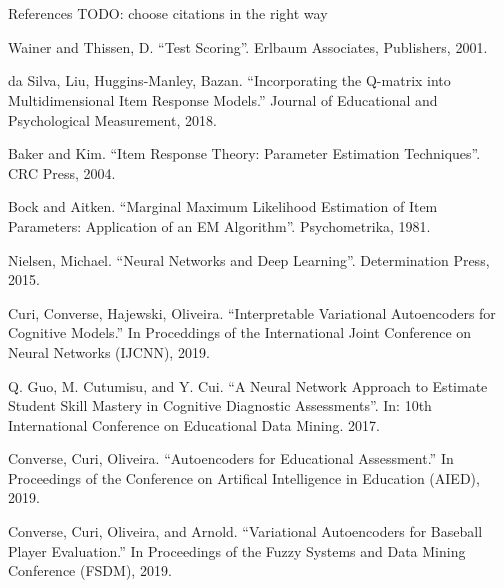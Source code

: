 \documentclass{beamer}
\theoremstyle{definition}
\begin{document}
\section{}
\begin{frame}{References}
    TODO: choose citations in the right way %
\begin{thebibliography}{2}
\tiny

 Wainer and Thissen, D. ``Test Scoring''. Erlbaum Associates, Publishers, 2001.

 da Silva, Liu, Huggins-Manley, Bazan. ``Incorporating the Q-matrix into Multidimensional Item Response Models.'' Journal of Educational and Psychological Measurement, 2018.

 Baker and Kim. ``Item Response Theory: Parameter Estimation Techniques''. CRC Press, 2004.

 Bock and Aitken. ``Marginal Maximum Likelihood Estimation of Item Parameters: Application of an EM Algorithm''. Psychometrika, 1981.

 Nielsen, Michael. ``Neural Networks and Deep Learning''. Determination Press, 2015.

 Curi, Converse, Hajewski, Oliveira. ``Interpretable Variational Autoencoders for Cognitive Models.'' In Proceddings of the International Joint Conference on Neural Networks (IJCNN), 2019.

 Q. Guo, M. Cutumisu, and Y. Cui. ``A Neural Network Approach to Estimate Student Skill Mastery in Cognitive Diagnostic Assessments''. In: 10th International Conference on Educational Data Mining. 2017.

 Converse, Curi, Oliveira. ``Autoencoders for Educational Assessment.'' In Proceedings of the Conference on Artifical Intelligence in Education (AIED), 2019.

 Converse, Curi, Oliveira, and Arnold. ``Variational Autoencoders for Baseball Player Evaluation.'' In Proceedings of the Fuzzy Systems and Data Mining Conference (FSDM), 2019.  


\end{thebibliography}
\end{frame}

\begin{frame}
  \titlepage
\end{frame}
\end{document}
